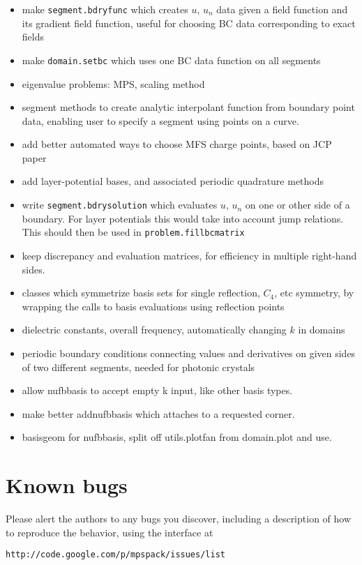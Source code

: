 \documentclass[12pt]{article}
\newcommand{\bi}{\begin{itemize}}
\newcommand{\ei}{\end{itemize}}
\begin{document}
\bi
\item make {\tt segment.bdryfunc} which creates $u$, $u_n$ data given a
field function and its gradient field function, useful for choosing BC
data corresponding to exact fields
\item make {\tt domain.setbc} which uses one BC data function on all segments
\item eigenvalue problems: MPS, scaling method
\item segment methods to create analytic interpolant function from boundary
point data, enabling user to specify a segment using points on a curve.
\item add better automated ways to choose MFS charge points, based on JCP paper
\item add layer-potential bases, and associated periodic quadrature methods
\item write {\tt segment.bdrysolution} which evaluates $u$, $u_n$ on one
or other side of a boundary. For layer potentials this would take into account
jump relations. This should then be used in {\tt problem.fillbcmatrix}
\item keep discrepancy and evaluation matrices, for efficiency in multiple
right-hand sides.
\item classes which symmetrize basis sets for single reflection, $C_4$, etc
symmetry, by wrapping the calls to basis evaluations using reflection
points
\item dielectric constants, overall frequency,
automatically changing $k$ in domains
\item periodic boundary conditions connecting values and derivatives
on given sides of two different segments, needed for photonic crystals
\item allow nufbbasis to accept empty k input, like other basis types.
\item make better addnufbbasis which attaches to a requested corner.
\item basisgeom for nufbbasis, split off utils.plotfan from domain.plot and
use.
\ei

\section{Known bugs}

Please alert the authors to any bugs you discover, including a description
of how to reproduce the behavior, using the interface at

{\tt http://code.google.com/p/mpspack/issues/list}

 

\end{document}
